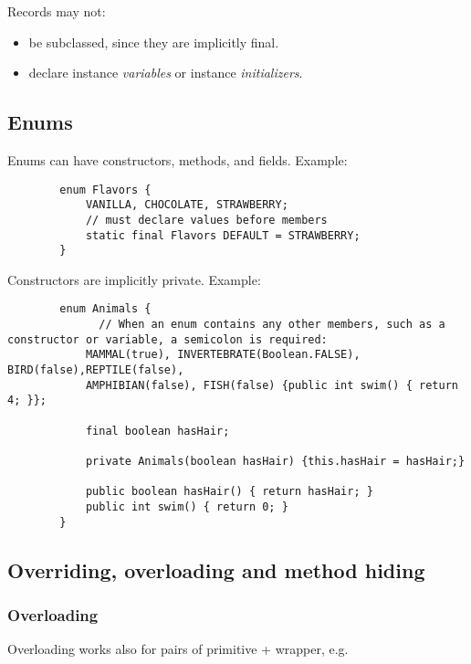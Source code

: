 \documentclass{scrartcl}
\begin{document}
    Records may not:

    \begin{itemize}
        \item be subclassed, since they are implicitly final.
        \item  declare instance \textit{variables} or instance \textit{initializers}.
    \end{itemize}

\subsection{Enums}

    Enums can have constructors, methods, and fields. Example:

        \begin{lstlisting}
        enum Flavors {
            VANILLA, CHOCOLATE, STRAWBERRY;
            // must declare values before members
            static final Flavors DEFAULT = STRAWBERRY;
        }
    \end{lstlisting}

    Constructors are implicitly private. Example:

     \begin{lstlisting}
        enum Animals {
              // When an enum contains any other members, such as a constructor or variable, a semicolon is required:
            MAMMAL(true), INVERTEBRATE(Boolean.FALSE), BIRD(false),REPTILE(false),
            AMPHIBIAN(false), FISH(false) {public int swim() { return 4; }};

            final boolean hasHair;

            private Animals(boolean hasHair) {this.hasHair = hasHair;}

            public boolean hasHair() { return hasHair; }
            public int swim() { return 0; }
        }

    \end{lstlisting}

\subsection{Overriding, overloading and method hiding}
\subsubsection{Overloading}

    Overloading works also for pairs of primitive + wrapper, e.g.
\end{document}
